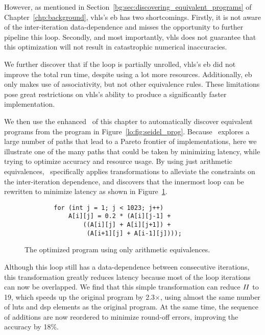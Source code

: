 However, as mentioned in Section~\ref{bg:sec:discovering_equivalent_programs}
of Chapter~\ref{chp:background}, \gls{vhls}'s \gls{eb} has two shortcomings.
Firstly, it is not aware of the inter-iteration data-dependence and misses the
opportunity to further pipeline this loop.  Secondly, and most importantly,
\gls{vhls} does not guarantee that this optimization will not result in
catastrophic numerical inaccuracies.

We further discover that if the loop is partially unrolled, \gls{vhls}'s
\gls{eb} did not improve the total run time, despite using a lot more
resources.  Additionally, \gls{eb} only makes use of associativity, but
not other equivalence rules.  These limitations pose great restrictions on
\gls{vhls}'s ability to produce a significantly faster implementation.

We then use the enhanced \soap~of this chapter to automatically discover
equivalent programs from the program in Figure~\ref{lo:fig:seidel_prog}.
Because \soap~explores a large number of paths that lead to a Pareto frontier
of implementations, here we illustrate one of the many paths that could be
taken by minimizing latency, while trying to optimize accuracy and resource
usage.  By using just arithmetic equivalences, \soap~specifically applies
transformations to alleviate the constraints on the inter-iteration dependence,
and discovers that the innermost loop can be rewritten to minimize latency as
shown in Figure~\ref{lo:fig:seidel_prog_2}.

\begin{figure}[ht]
    \begin{lstlisting}
        for (int j = 1; j < 1023; j++)
            A[i][j] = 0.2 * (A[i][j-1] +
                ((A[i][j] + A[i][j+1]) +
                 (A[i+1][j] + A[i-1][j])));
    \end{lstlisting}
    \caption{The optimized program using only arithmetic equivalences.}
    \label{lo:fig:seidel_prog_2}
\end{figure}

Although this loop still has a data-dependence between consecutive iterations,
this transformation greatly reduces latency because most of the loop iterations
can now be overlapped.  We find that this simple transformation can reduce
$\mathit{II}$ to 19, which speeds up the original program by 2.3$\times$, using almost
the same number of \glspl{lut} and \gls{dsp} elements as the original program.
At the same time, the sequence of additions are now reordered to minimize
round-off errors, improving the accuracy by 18\%.

